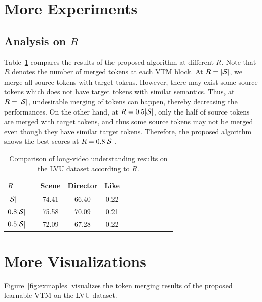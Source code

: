 \documentclass{article}
\begin{document}
\section{More Experiments}


\subsection{Analysis on $R$}
Table~\ref{table:R_study} compares the results of the proposed algorithm at different $R$. Note that $R$ denotes the number of merged tokens at each VTM block. At $R = |{\cal S}|$, we merge all source tokens with target tokens. However, there may exist some source tokens which does not have target tokens with similar semantics. Thus, at $R = |{\cal S}|$, undesirable merging of tokens can happen, thereby decreasing the performances. On the other hand, at $R = 0.5|{\cal S}|$, only the half of source tokens are merged with target tokens, and thus some source tokens may not be merged even though they have similar target tokens. Therefore, the proposed algorithm shows the best scores at $R = 0.8|{\cal S}|$.

\begin{table}[h!]
\caption
    {
        Comparison of long-video understanding results on the LVU dataset according to $R$.
    }
\centering
\footnotesize

    \begin{tabular}{@{} l c c c c c c c c c c c @{} }
        \toprule
        $R$ && Scene & Director & Like  \\
        \midrule
          $|{\cal S}|$    && 74.41 & 66.40 & 0.22  \\
          $0.8|{\cal S}|$ && 75.58 & 70.09 & 0.21  \\
          $0.5|{\cal S}|$ && 72.09 & 67.28 & 0.22  \\ 
        \bottomrule
    \end{tabular} 
    \label{table:R_study}

\end{table}











\clearpage
\section{More Visualizations}
Figure~\ref{fig:exmaples} visualizes the token merging results of the proposed learnable VTM on the LVU dataset.
\end{document}
